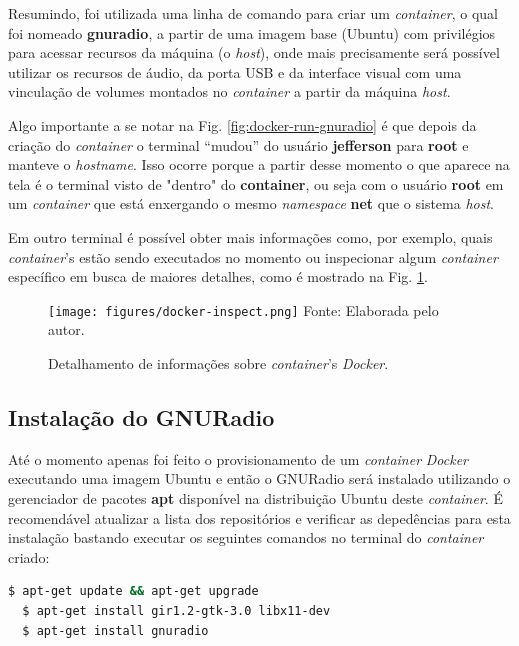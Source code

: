 \documentclass[
  12pt,				%
  openright,			%
  twoside,			%
  a4paper,			%
  english,			%
  french,				%
  spanish,			%
  brazil,				%
  ]{abntex2}
\begin{document}
Resumindo, foi utilizada uma linha de comando para criar um \textit{container}, o qual foi nomeado \textbf{gnuradio}, a partir de uma imagem base (Ubuntu) com
privilégios para acessar recursos da máquina (o \textit{host}), onde mais precisamente será possível utilizar os recursos de áudio, da porta USB e da
interface visual com uma vinculação de volumes montados no \textit{container} a partir da máquina \textit{host}.

Algo importante a se notar na Fig. \ref{fig:docker-run-gnuradio} é que depois da criação do \textit{container} o terminal “mudou” do usuário \textbf{jefferson} para \textbf{root}
e manteve o \textit{hostname}. Isso ocorre porque a partir desse momento o que aparece na tela é o terminal visto de "dentro"
do \textbf{container}, ou seja com o usuário \textbf{root} em um \textit{container} que está enxergando o mesmo \textit{namespace} \textbf{net} que o
sistema \textit{host}.

Em outro terminal é possível obter mais informações como, por exemplo, quais \textit{container}'s estão sendo executados no momento ou inspecionar algum
\textit{container} específico em busca de maiores detalhes, como é mostrado na Fig. \ref{fig:docker-inspect}.

\begin{figure}[!htb]
  \centering
  \caption{Detalhamento de informações sobre \textit{container}’s \textit{Docker}.}
  \texttt{[image: figures/docker-inspect.png]}
  Fonte: Elaborada pelo autor.
  \label{fig:docker-inspect}
\end{figure}

\newpage
\subsection*{Instalação do GNURadio}

Até o momento apenas foi feito o provisionamento de um \textit{container} \textit{Docker} executando uma imagem Ubuntu e então o GNURadio será instalado utilizando
o gerenciador de pacotes \textbf{apt} disponível na distribuição Ubuntu deste \textit{container}. É recomendável atualizar a lista dos repositórios e verificar
as depedências para esta instalação bastando executar os seguintes comandos no terminal do \textit{container} criado:

\begin{adjustbox}{max width=\linewidth}
  \begin{lstlisting}[language=bash]
  $ apt-get update && apt-get upgrade
  $ apt-get install gir1.2-gtk-3.0 libx11-dev
  $ apt-get install gnuradio
\end{lstlisting}
\end{adjustbox}
\end{document}
